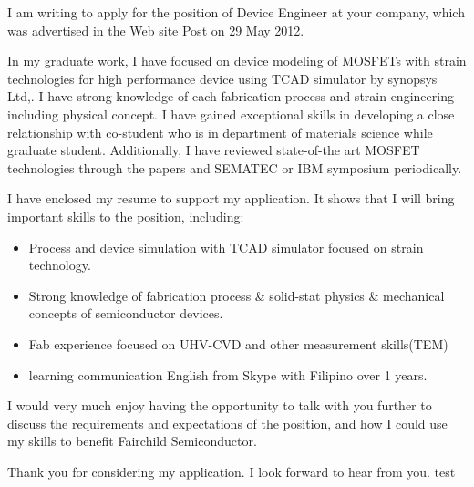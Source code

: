 \documentclass[11pt,stdletter,dateno]{newlfm}
\begin{document}
\begin{newlfm}

I am writing to apply for the position of Device Engineer at your
company, which was advertised in the Web site Post on 29 May 2012.

In my graduate work, I have focused on device modeling of MOSFETs
with strain technologies for high performance device using TCAD
simulator by synopsys Ltd,. I have strong knowledge of each
fabrication process and strain engineering including physical
concept. I have gained exceptional skills in developing a close
relationship with co-student who is in department of materials
science while graduate student. Additionally, I have reviewed
state-of-the art MOSFET technologies through the papers and SEMATEC
or IBM symposium periodically.

 I have enclosed my resume to support my application. It shows that I will bring
important skills to the position, including:

  \begin{itemize} \itemsep -2pt  %
   \item Process and device simulation with TCAD simulator focused
   on strain technology.
   \item Strong knowledge of fabrication process \& solid-stat physics \&
   mechanical concepts of semiconductor devices.
   \item Fab experience focused on UHV-CVD and other measurement skills(TEM)
   \item learning communication English from Skype with Filipino
   over 1 years.
    \end{itemize}

I would very much enjoy having the opportunity to talk with you
further to discuss the requirements and expectations of the
position, and how I could use my skills to benefit Fairchild
Semiconductor.

Thank you for considering my application. I look forward to hear from you.
test 
\end{newlfm}
\end{document}
